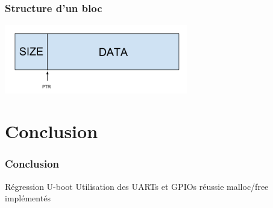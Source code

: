 \documentclass{beamer}
\begin{document}
\begin{frame}
  \frametitle{Structure d'un bloc}
  \begin{itemize}
\includegraphics[width=8cm]{memblock.png}
  \end{itemize}
\end{frame}

\let\origaddtocontents=\addtocontents
\def\dontaddtocontents#1#2{}
\let\addtocontents=\dontaddtocontents
\section*{Conclusion}
\let\addtocontents=\origaddtocontents

\begin{frame}
  \frametitle{Conclusion}
Régression U-boot
Utilisation des UARTs et GPIOs réussie
malloc/free implémentés
\end{frame}
\end{document}
